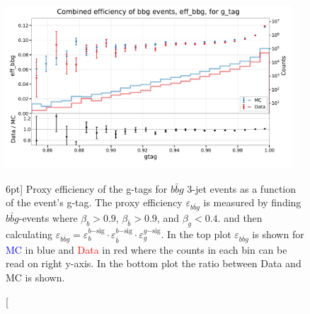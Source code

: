 \documentclass[a4paper, twoside]{tufte-book}
\begin{document}
\begin{figure}
  \includegraphics[width=0.95\textwidth, trim=0 0 0 40, clip]{figures/quarks/eff_bbg_gtag-down_sample=1.00-ML_vars=vertex-selection=b-ejet_min=4-n_iter_RS_lgb=99-n_iter_RS_xgb=9-cdot_cut=0.90-version=19.pdf}
  \caption[g-Tagging proxy efficiency for $b\bar{b}g$-events as function of g-tag][6pt]
          {Proxy efficiency of the g-tags for $b\bar{b}g$ 3-jet events as a function of the event's g-tag. The proxy efficiency $\varepsilon_{b\bar{b}g}$ is measured by finding $b\bar{b}g$-events where $\beta_b > 0.9$, $\beta_{\bar{b}}>0.9$, and $\beta_g < 0.4$. and then calculating  $\varepsilon_{b\bar{b}g} = \varepsilon_b^{b\mathrm{-sig}} \cdot \varepsilon_{\bar{b}}^{b\mathrm{-sig}} \cdot  \varepsilon_g^{g\mathrm{-sig}} $. In the top plot $\varepsilon_{b\bar{b}g}$ is shown for \textcolor{blue}{MC} in blue and \textcolor{red}{Data} in red where the counts in each bin can be read on right y-axis. In the bottom plot the ratio between Data and MC is shown.
          } 
  \label{fig:q:effiency_btag_bbg_gtag}
\end{figure}
\end{document}
